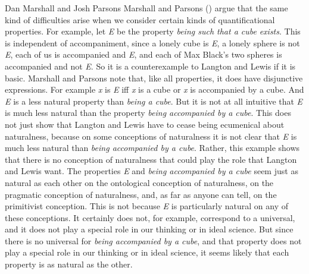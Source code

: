 \documentclass[
  10pt,
  letterpaper,
  DIV=11,
  numbers=noendperiod,
  twoside]{scrartcl}
\begin{document}
Dan Marshall and Josh Parsons Marshall and Parsons
() argue that the same kind of
difficulties arise when we consider certain kinds of quantificational
properties. For example, let \emph{E} be the property \emph{being such
that a cube} \emph{exists}. This is independent of accompaniment, since
a lonely cube is \emph{E}, a lonely sphere is not \emph{E}, each of us
is accompanied and \emph{E}, and each of Max Black's two spheres is
accompanied and not \emph{E}. So it is a counterexample to Langton and
Lewis if it is basic. Marshall and Parsons note that, like all
properties, it does have disjunctive expressions. For example \emph{x}
is \emph{E} iff \emph{x} is a cube or \emph{x} is accompanied by a cube.
And \emph{E} is a less natural property than \emph{being a cube}. But it
is not at all intuitive that \emph{E} is much less natural than the
property \emph{being accompanied by a cube}. This does not just show
that Langton and Lewis have to cease being ecumenical about naturalness,
because on some conceptions of naturalness it is not clear that \emph{E}
is much less natural than \emph{being accompanied by a cube}. Rather,
this example shows that there is no conception of naturalness that could
play the role that Langton and Lewis want. The properties \emph{E} and
\emph{being accompanied by a cube} seem just as natural as each other on
the ontological conception of naturalness, on the pragmatic conception
of naturalness, and, as far as anyone can tell, on the primitivist
conception. This is not because \emph{E} is particularly natural on any
of these conceptions. It certainly does not, for example, correspond to
a universal, and it does not play a special role in our thinking or in
ideal science. But since there is no universal for \emph{being
accompanied by a cube}, and that property does not play a special role
in our thinking or in ideal science, it seems likely that each property
is as natural as the other.
\end{document}

